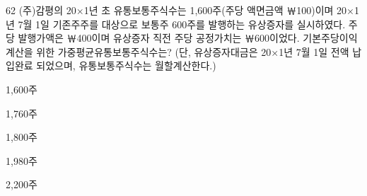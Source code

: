 \begin{question}{62}
(주)감평의 20×1년 초 유통보통주식수는 1,600주(주당 액면금액 ￦100)이며 20×1년 7월 1일 기존주주를 대상으로 보통주 600주를 발행하는 유상증자를 실시하였다. 주당 발행가액은 ￦400이며 유상증자 직전 주당 공정가치는 ￦600이었다. 기본주당이익 계산을 위한 가중평균유통보통주식수는? (단, 유상증자대금은 20×1년 7월 1일 전액 납입완료 되었으며, 유통보통주식수는 월할계산한다.)
\begin{choices}
  \item 1,600주
  \item 1,760주
  \item 1,800주
  \item 1,980주
  \item 2,200주
\end{choices}
\end{question}
